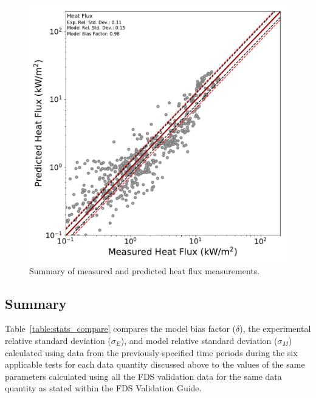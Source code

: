 \begin{figure}[!h]
	\centering
	\includegraphics[width=\columnwidth]{Figures/Plots/Validation/Heat_Flux/loglog_HFs}
	\caption{Summary of measured and predicted heat flux measurements.}
	\label{fig:loglog_HFs}
\end{figure}

\clearpage
\subsection{Summary}
Table~\ref{table:stats_compare} compares the model bias factor ($\delta$), the experimental relative standard deviation ($\sigma_E$), and model relative standard deviation ($\sigma_M$) calculated using data from the previously-specified time periods during the six applicable tests for each data quantity discussed above to the values of the same parameters calculated using all the FDS validation data for the same data quantity as stated within the FDS Validation Guide.


